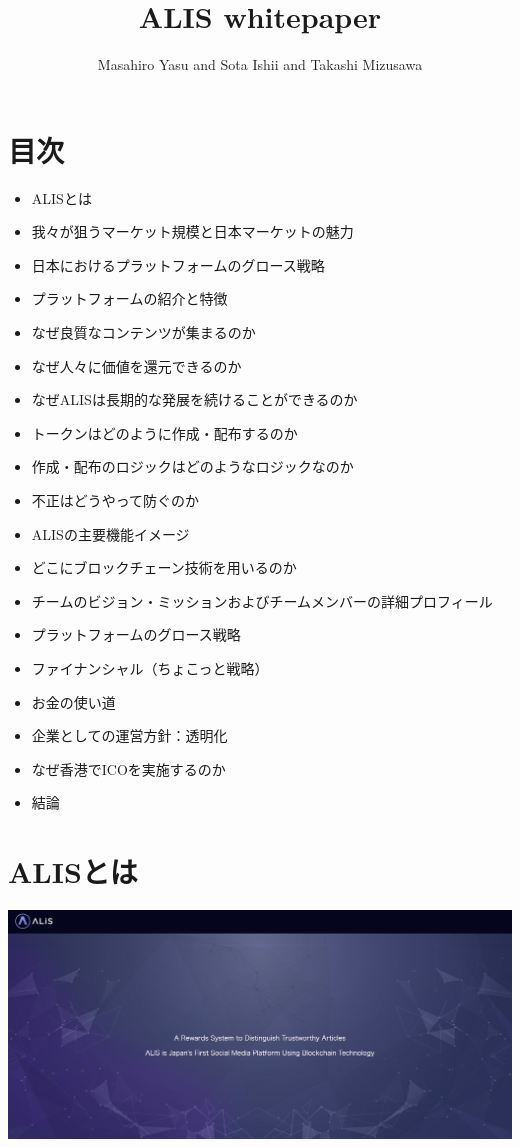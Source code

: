 \documentclass{jsarticle}
\begin{document}
\title{ALIS whitepaper}
\author{Masahiro Yasu and Sota Ishii and Takashi Mizusawa}
\maketitle

\section{目次}
\begin{itemize}
	\item ALISとは
	\item 我々が狙うマーケット規模と日本マーケットの魅力
	\item 日本におけるプラットフォームのグロース戦略
	\item プラットフォームの紹介と特徴
	\item なぜ良質なコンテンツが集まるのか
	\item なぜ人々に価値を還元できるのか
	\item なぜALISは長期的な発展を続けることができるのか
	\item トークンはどのように作成・配布するのか
	\item 作成・配布のロジックはどのようなロジックなのか
	\item 不正はどうやって防ぐのか
	\item ALISの主要機能イメージ
	\item どこにブロックチェーン技術を用いるのか
	\item チームのビジョン・ミッションおよびチームメンバーの詳細プロフィール
	\item プラットフォームのグロース戦略
	\item ファイナンシャル（ちょこっと戦略）
	\item お金の使い道
	\item 企業としての運営方針：透明化
	\item なぜ香港でICOを実施するのか
	\item 結論
\end{itemize}
\section{ALISとは}
	\includegraphics[scale=0.25]{img/aliscover.png}
\end{document}
